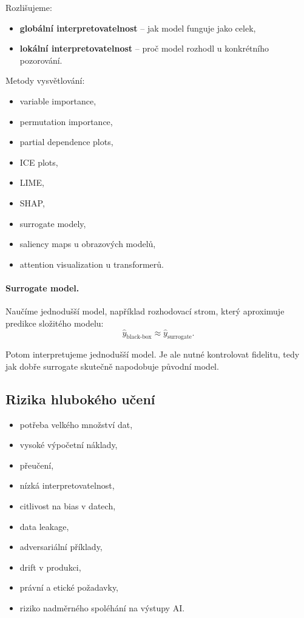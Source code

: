 Rozlišujeme:
\begin{itemize}
    \item \textbf{globální interpretovatelnost} -- jak model funguje jako celek,
    \item \textbf{lokální interpretovatelnost} -- proč model rozhodl u konkrétního pozorování.
\end{itemize}

Metody vysvětlování:
\begin{itemize}
    \item variable importance,
    \item permutation importance,
    \item partial dependence plots,
    \item ICE plots,
    \item LIME,
    \item SHAP,
    \item surrogate modely,
    \item saliency maps u obrazových modelů,
    \item attention visualization u transformerů.
\end{itemize}

\paragraph{Surrogate model.}
Naučíme jednodušší model, například rozhodovací strom, který aproximuje predikce složitého modelu:
\[
\hat y_{\text{black-box}}
\approx
\hat y_{\text{surrogate}}.
\]

Potom interpretujeme jednodušší model. Je ale nutné kontrolovat fidelitu, tedy jak dobře surrogate skutečně
napodobuje původní model.

\subsection{Rizika hlubokého učení}

\begin{itemize}
    \item potřeba velkého množství dat,
    \item vysoké výpočetní náklady,
    \item přeučení,
    \item nízká interpretovatelnost,
    \item citlivost na bias v datech,
    \item data leakage,
    \item adversariální příklady,
    \item drift v produkci,
    \item právní a etické požadavky,
    \item riziko nadměrného spoléhání na výstupy AI.
\end{itemize}

